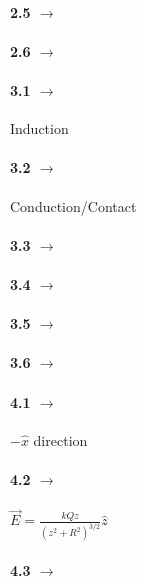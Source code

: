 \documentclass[11pt]{article}
\begin{document}
\paragraph{2.5 $\rightarrow$}
\paragraph{2.6 $\rightarrow$}

\paragraph{3.1 $\rightarrow$} Induction
\paragraph{3.2 $\rightarrow$} Conduction/Contact
\paragraph{3.3 $\rightarrow$} 
\paragraph{3.4 $\rightarrow$} 
\paragraph{3.5 $\rightarrow$} 
\paragraph{3.6 $\rightarrow$} 

\paragraph{4.1 $\rightarrow$} $-\hat{x}$ direction
\paragraph{4.2 $\rightarrow$} $\vec{E} = \frac{kQz}{(z^2 + R^2)^{3/2}}\hat{z}$
\paragraph{4.3 $\rightarrow$} 
\end{document}
